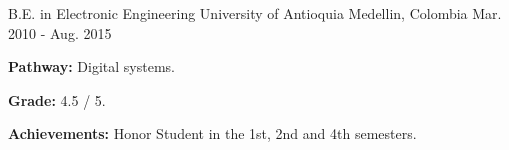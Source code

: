 \begin{cventries}
    \cventry
    {B.E. in Electronic Engineering} %
    {University of Antioquia} %
    {Medellin, Colombia} %
    {Mar. 2010 - Aug. 2015} %
    {
      \begin{cvitems} %
        \item {\textbf{Pathway:} Digital systems.}
        \item {\textbf{Grade:} 4.5 / 5.}
        \item {\textbf{Achievements:} Honor Student in the 1st, 2nd and 4th semesters.}
      \end{cvitems}
    }

\end{cventries}
